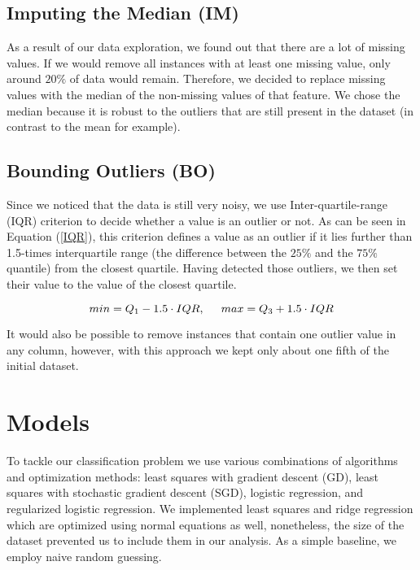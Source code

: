 \subsection{Imputing the Median (IM)}

As a result of our data exploration, we found out that there are a lot of missing values. If we would remove all instances with at least one missing value, only around $20\%$ of data would remain. Therefore, we decided to replace missing values with the median of the non-missing values of that feature. We chose the median because it is robust to the outliers that are still present in the dataset (in contrast to the mean for example).



\subsection{Bounding Outliers (BO)}

Since we noticed that the data is still very noisy, we use Inter-quartile-range (IQR) criterion to decide whether a value is an outlier or not. As can be seen in Equation (\ref{IQR}), this criterion defines a value as an outlier if it lies further than 1.5-times interquartile range (the difference between the $25\%$ and the $75\%$ quantile) from the closest quartile. Having detected those outliers, we then set their value to the value of the closest quartile.

\begin{equation} \label{IQR}
   min = Q_1 - 1.5 \cdot IQR, \hspace{0.5cm} max = Q_3 + 1.5 \cdot IQR
\end{equation}

It would also be possible to remove instances that contain one outlier value in any column, however, with this approach we kept only about one fifth of the initial dataset.








\section{Models}
\label{models}

To tackle our classification problem we use various combinations of algorithms and optimization methods: least squares with gradient descent (GD), least squares with stochastic gradient descent (SGD), logistic regression, and regularized logistic regression. We implemented least squares and ridge regression which are optimized using normal equations as well, nonetheless, the size of the dataset prevented us to include them in our analysis. As a simple baseline, we employ naive random guessing.


